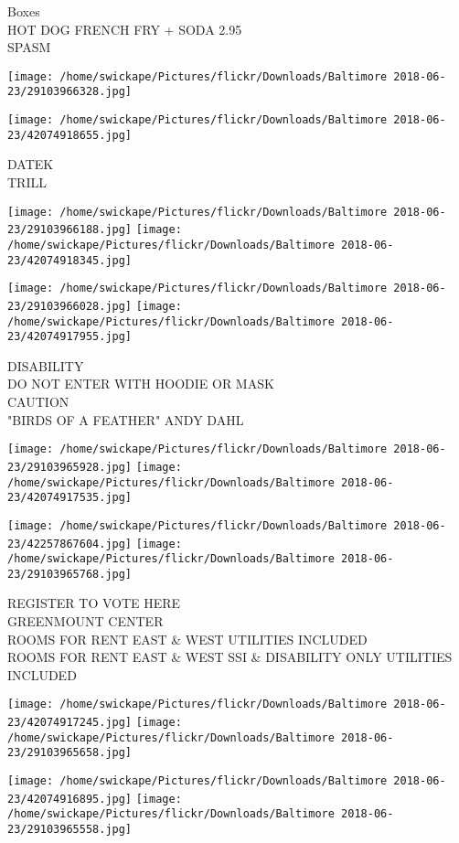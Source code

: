 \documentclass[10pt,letterpaper]{article}
\begin{document}
Boxes\\
HOT DOG FRENCH FRY + SODA 2.95\\
SPASM
\pagebreak

\texttt{[image: /home/swickape/Pictures/flickr/Downloads/Baltimore 2018-06-23/29103966328.jpg]}

\vspace{0.25in}
\texttt{[image: /home/swickape/Pictures/flickr/Downloads/Baltimore 2018-06-23/42074918655.jpg]}

DATEK\\
TRILL
\pagebreak

\texttt{[image: /home/swickape/Pictures/flickr/Downloads/Baltimore 2018-06-23/29103966188.jpg]}
\texttt{[image: /home/swickape/Pictures/flickr/Downloads/Baltimore 2018-06-23/42074918345.jpg]}

\texttt{[image: /home/swickape/Pictures/flickr/Downloads/Baltimore 2018-06-23/29103966028.jpg]}
\texttt{[image: /home/swickape/Pictures/flickr/Downloads/Baltimore 2018-06-23/42074917955.jpg]}

DISABILITY\\
DO NOT ENTER WITH HOODIE OR MASK\\
CAUTION\\
"BIRDS OF A FEATHER" ANDY DAHL
\pagebreak

\texttt{[image: /home/swickape/Pictures/flickr/Downloads/Baltimore 2018-06-23/29103965928.jpg]}
\texttt{[image: /home/swickape/Pictures/flickr/Downloads/Baltimore 2018-06-23/42074917535.jpg]}

\texttt{[image: /home/swickape/Pictures/flickr/Downloads/Baltimore 2018-06-23/42257867604.jpg]}
\texttt{[image: /home/swickape/Pictures/flickr/Downloads/Baltimore 2018-06-23/29103965768.jpg]}

REGISTER TO VOTE HERE\\
GREENMOUNT CENTER\\
ROOMS FOR RENT EAST \& WEST UTILITIES INCLUDED\\
ROOMS FOR RENT EAST \& WEST SSI \& DISABILITY ONLY UTILITIES INCLUDED
\pagebreak

\texttt{[image: /home/swickape/Pictures/flickr/Downloads/Baltimore 2018-06-23/42074917245.jpg]}
\texttt{[image: /home/swickape/Pictures/flickr/Downloads/Baltimore 2018-06-23/29103965658.jpg]}

\texttt{[image: /home/swickape/Pictures/flickr/Downloads/Baltimore 2018-06-23/42074916895.jpg]}
\texttt{[image: /home/swickape/Pictures/flickr/Downloads/Baltimore 2018-06-23/29103965558.jpg]}
\end{document}
